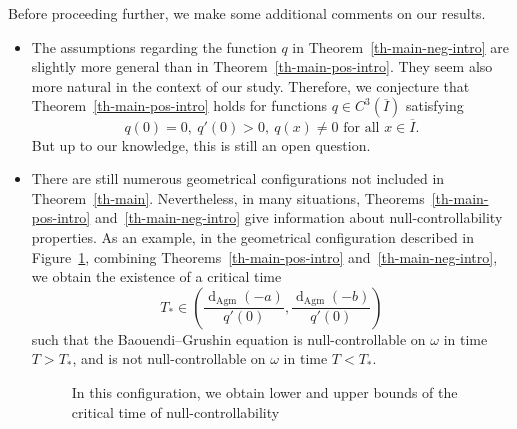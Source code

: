 \documentclass[AHL,Unicode,longabstracts,published]{cedram}
\newcommand{\1}{\mathds 1}
\newcommand{\dagmon}{\mathop{\mathrm{d}}\nolimits_{\mathrm{Agm}}}
\renewcommand{\o}{\omega}
\renewcommand{\o}{\omega}
\begin{document}
Before proceeding further, we make some additional comments on our results.
\begin{itemize}
\item The assumptions regarding the function $q$ in Theorem~\ref{th-main-neg-intro} are slightly more general than in Theorem~\ref{th-main-pos-intro}. They seem also more natural in the context of our study. Therefore, we conjecture that Theorem~\ref{th-main-pos-intro} holds for functions $q \in C^3(\overline I)$ satisfying
\[
q(0) = 0, \ q'(0) > 0, \ q(x) \neq 0 \text{ for all } x \in \overline{I}.
\]
But up to our knowledge, this is still an open question.
\item There are still numerous geometrical configurations not included in Theorem~\ref{th-main}. Nevertheless, in many situations, Theorems~\ref{th-main-pos-intro} and~\ref{th-main-neg-intro} give information about null-controllability properties. As an example, in the geometrical configuration described in Figure~\ref{fig:example3}, combining Theorems~\ref{th-main-pos-intro} and~\ref{th-main-neg-intro}, we obtain the existence of a critical time
\[
T_* \in \left(\frac {\dagmon(-a)}{q'(0)}, \frac {\dagmon(-b)}{q'(0)} \right)
\]
such that the Baouendi--Grushin equation is null-controllable on $\o$ in time $T>T_*$, and is not null-controllable on $\o $ in time $T< T_*$.

\begin{figure}[ht]
\centering
{}
\caption{In this configuration, we obtain lower and upper bounds of the critical time of null-controllability}\label{fig:example3}
\end{figure}


\end{itemize}
\end{document}

